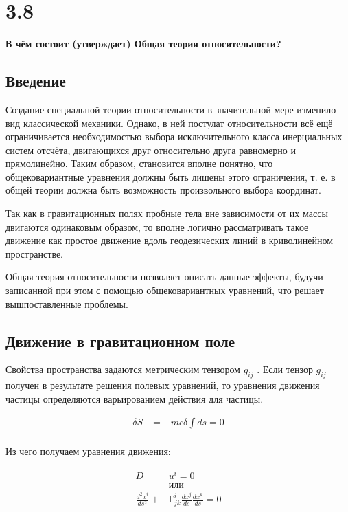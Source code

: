 \documentclass[a4paper,14pt]{article}
\begin{document}
\section*{3.8}

\begin{center}
	\LARGE{\textbf{В чём состоит (утверждает) Общая теория относительности?}}\\
\end{center}

\subsection*{Введение}

	Создание специальной теории относительности в значительной мере изменило вид классической механики. Однако, в ней постулат относительности всё ещё ограничивается необходимостью выбора исключительного класса инерциальных систем отсчёта, двигающихся друг относительно друга равномерно и прямолинейно. Таким образом, становится вполне понятно, что общековариантные уравнения должны быть лишены этого ограничения, т. е. в общей теории должна быть возможность произвольного выбора координат.

	Так как в гравитационных полях пробные тела вне зависимости от их массы двигаются одинаковым образом, то вполне логично рассматривать такое движение как простое движение вдоль геодезических линий в криволинейном пространстве. 

	Общая теория относительности позволяет описать данные эффекты, будучи записанной при этом с помощью общековариантных уравнений, что решает вышпоставленные проблемы. 

\subsection*{Движение в гравитационном поле}

	Свойства пространства задаются метрическим тензором $ g_{ij} $ . Если тензор $ g_{ij} $
	получен в результате решения полевых уравнений, то уравнения движения частицы определяются варьированием действия для частицы. 

	\begin{align*}
		\delta S & = -mc \delta \int ds = 0 \\
	\end{align*}

	Из чего получаем уравнения движения:

	\begin{align*}
		D & u^i = 0 \\
		& или      \\
		\frac{d^2 x^i}{ds^2} + & Г_{jk}^i \frac{dx^j}{ds} \frac{dx^k}{ds} = 0 \\
	\end{align*}
\end{document}
